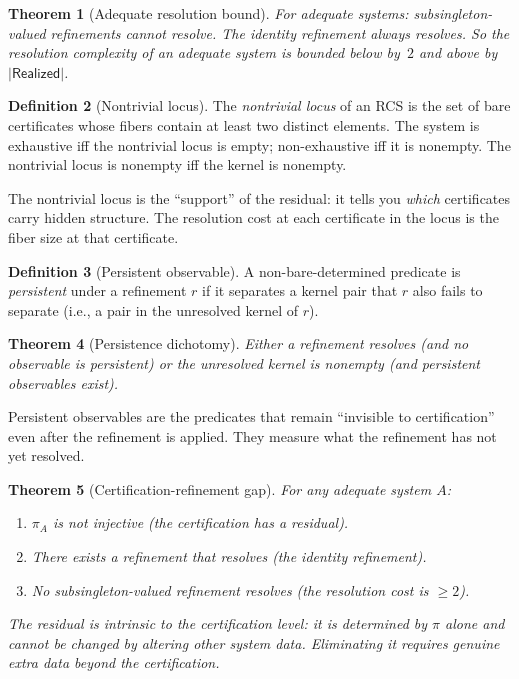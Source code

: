 \documentclass[11pt,a4paper]{article}
\theoremstyle{plain}
\newtheorem{theorem}{Theorem}[section]
\theoremstyle{definition}
\newtheorem{definition}[theorem]{Definition}
\theoremstyle{remark}
\newcommand{\Real}{\mathsf{Realized}}
\newcommand{\compare}{\pi}
\begin{document}
\begin{theorem}[Adequate resolution bound]\label{thm:adequate-bound}
For adequate systems: subsingleton-valued refinements cannot resolve.
The identity refinement always resolves. So the resolution complexity of an
adequate system is bounded below by~$2$ and above by~$|\Real|$.
\end{theorem}

\begin{definition}[Nontrivial locus]\label{def:nontrivial-locus}
The \emph{nontrivial locus} of an RCS is the set of bare certificates whose
fibers contain at least two distinct elements. The system is exhaustive iff
the nontrivial locus is empty; non-exhaustive iff it is nonempty. The
nontrivial locus is nonempty iff the kernel is nonempty.
\end{definition}

The nontrivial locus is the ``support'' of the residual: it tells you
\emph{which} certificates carry hidden structure. The resolution cost at
each certificate in the locus is the fiber size at that certificate.

\begin{definition}[Persistent observable]\label{def:persistent}
A non-bare-determined predicate is \emph{persistent} under a refinement $r$
if it separates a kernel pair that $r$ also fails to separate (i.e., a pair
in the unresolved kernel of $r$).
\end{definition}

\begin{theorem}[Persistence dichotomy]\label{thm:persist}
Either a refinement resolves (and no observable is persistent) or the
unresolved kernel is nonempty (and persistent observables exist).
\end{theorem}

Persistent observables are the predicates that remain ``invisible to
certification'' even after the refinement is applied. They measure what
the refinement has not yet resolved.

\begin{theorem}[Certification-refinement gap]\label{thm:cert-gap}
For any adequate system $A$:
\begin{enumerate}[label=(\roman*),nosep]
\item $\compare_A$ is not injective (the certification has a residual).
\item There exists a refinement that resolves (the identity refinement).
\item No subsingleton-valued refinement resolves (the resolution cost is $\geq 2$).
\end{enumerate}
The residual is intrinsic to the certification level: it is determined by
$\compare$ alone and cannot be changed by altering other system data. Eliminating
it requires genuine extra data beyond the certification.
\end{theorem}
\end{document}
